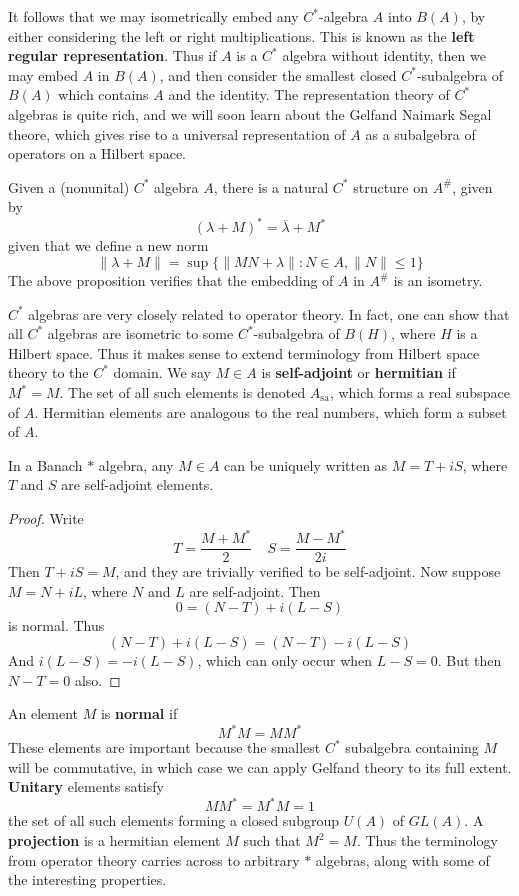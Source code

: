 It follows that we may isometrically embed any $C^*$-algebra $A$ into $B(A)$, by either considering the left or right multiplications. This is known as the {\bf left regular representation}. Thus if $A$ is a $C^*$ algebra without identity, then we may embed $A$ in $B(A)$, and then consider the smallest closed $C^*$-subalgebra of $B(A)$ which contains $A$ and the identity. The representation theory of $C^*$ algebras is quite rich, and we will soon learn about the Gelfand Naimark Segal theore, which gives rise to a universal representation of $A$ as a subalgebra of operators on a Hilbert space.

Given a (nonunital) $C^*$ algebra $A$, there is a natural $C^*$ structure on $A^\#$, given by
%
\[ (\lambda + M)^* = \overline{\lambda} + M^* \]
%
given that we define a new norm
%
\[ \| \lambda + M \| = \sup \{ \| MN + \lambda \| : N \in A, \| N \| \leq 1 \} \]
%
The above proposition verifies that the embedding of $A$ in $A^\#$ is an isometry.

$C^*$ algebras are very closely related to operator theory. In fact, one can show that all $C^*$ algebras are isometric to some $C^*$-subalgebra of $B(H)$, where $H$ is a Hilbert space. Thus it makes sense to extend terminology from Hilbert space theory to the $C^*$ domain. We say $M \in A$ is {\bf self-adjoint} or {\bf hermitian} if $M^* = M$. The set of all such elements is denoted $A_{\text{sa}}$, which forms a real subspace of $A$. Hermitian elements are analogous to the real numbers, which form a subset of $A$.

\begin{prop}
    In a Banach $*$ algebra, any $M \in A$ can be uniquely written as $M = T + iS$, where $T$ and $S$ are self-adjoint elements.
\end{prop}
\begin{proof}
    Write
    \[ T = \frac{M + M^*}{2}\ \ \ \ \ S = \frac{M - M^*}{2i} \]
    Then $T + iS = M$, and they are trivially verified to be self-adjoint. Now suppose $M = N + iL$, where $N$ and $L$ are self-adjoint. Then
    \[ 0 = (N - T) + i(L - S) \]
    is normal. Thus
    \[ (N - T) + i(L - S) = (N - T) - i(L - S) \]
    And $i(L - S) = -i(L - S)$, which can only occur when $L - S = 0$. But then $N - T = 0$ also.
\end{proof}

An element $M$ is {\bf normal} if
%
\[ M^* M = MM^* \]
%
These elements are important because the smallest $C^*$ subalgebra containing $M$ will be commutative, in which case we can apply Gelfand theory to its full extent. {\bf Unitary} elements satisfy
%
\[ MM^* = M^*M = 1 \]
%
the set of all such elements forming a closed subgroup $U(A)$ of $GL(A)$. A {\bf projection} is a hermitian element $M$ such that $M^2 = M$. Thus the terminology from operator theory carries across to arbitrary $*$ algebras, along with some of the interesting properties.

